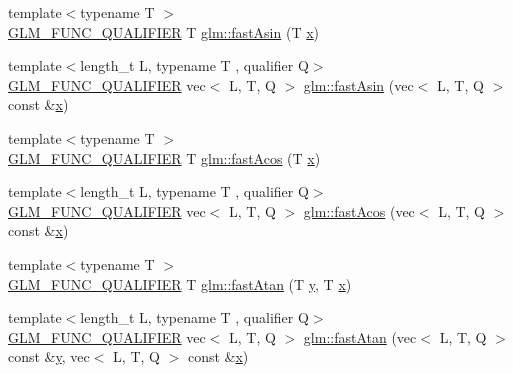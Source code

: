 \begin{DoxyCompactItemize}
\item 
{\footnotesize template$<$typename T $>$ }\\\mbox{\hyperlink{setup_8hpp_a33fdea6f91c5f834105f7415e2a64407}{G\+L\+M\+\_\+\+F\+U\+N\+C\+\_\+\+Q\+U\+A\+L\+I\+F\+I\+ER}} T \mbox{\hyperlink{group__gtx__fast__trigonometry_ga562cb62c51fbfe7fac7db0bce706b81f}{glm\+::fast\+Asin}} (T \mbox{\hyperlink{_s_d_l__opengl_8h_ad0e63d0edcdbd3d79554076bf309fd47}{x}})
\item 
{\footnotesize template$<$length\+\_\+t L, typename T , qualifier Q$>$ }\\\mbox{\hyperlink{setup_8hpp_a33fdea6f91c5f834105f7415e2a64407}{G\+L\+M\+\_\+\+F\+U\+N\+C\+\_\+\+Q\+U\+A\+L\+I\+F\+I\+ER}} vec$<$ L, T, Q $>$ \mbox{\hyperlink{namespaceglm_ab68197620bdf27dda884e87d5bc588f0}{glm\+::fast\+Asin}} (vec$<$ L, T, Q $>$ const \&\mbox{\hyperlink{_s_d_l__opengl_8h_ad0e63d0edcdbd3d79554076bf309fd47}{x}})
\item 
{\footnotesize template$<$typename T $>$ }\\\mbox{\hyperlink{setup_8hpp_a33fdea6f91c5f834105f7415e2a64407}{G\+L\+M\+\_\+\+F\+U\+N\+C\+\_\+\+Q\+U\+A\+L\+I\+F\+I\+ER}} T \mbox{\hyperlink{group__gtx__fast__trigonometry_ga9721d63356e5d94fdc4b393a426ab26b}{glm\+::fast\+Acos}} (T \mbox{\hyperlink{_s_d_l__opengl_8h_ad0e63d0edcdbd3d79554076bf309fd47}{x}})
\item 
{\footnotesize template$<$length\+\_\+t L, typename T , qualifier Q$>$ }\\\mbox{\hyperlink{setup_8hpp_a33fdea6f91c5f834105f7415e2a64407}{G\+L\+M\+\_\+\+F\+U\+N\+C\+\_\+\+Q\+U\+A\+L\+I\+F\+I\+ER}} vec$<$ L, T, Q $>$ \mbox{\hyperlink{namespaceglm_ae3688eb19af1c7efa981e983fee56340}{glm\+::fast\+Acos}} (vec$<$ L, T, Q $>$ const \&\mbox{\hyperlink{_s_d_l__opengl_8h_ad0e63d0edcdbd3d79554076bf309fd47}{x}})
\item 
{\footnotesize template$<$typename T $>$ }\\\mbox{\hyperlink{setup_8hpp_a33fdea6f91c5f834105f7415e2a64407}{G\+L\+M\+\_\+\+F\+U\+N\+C\+\_\+\+Q\+U\+A\+L\+I\+F\+I\+ER}} T \mbox{\hyperlink{group__gtx__fast__trigonometry_ga8d197c6ef564f5e5d59af3b3f8adcc2c}{glm\+::fast\+Atan}} (T \mbox{\hyperlink{_s_d_l__opengl_8h_a1675d9d7bb68e1657ff028643b4037e3}{y}}, T \mbox{\hyperlink{_s_d_l__opengl_8h_ad0e63d0edcdbd3d79554076bf309fd47}{x}})
\item 
{\footnotesize template$<$length\+\_\+t L, typename T , qualifier Q$>$ }\\\mbox{\hyperlink{setup_8hpp_a33fdea6f91c5f834105f7415e2a64407}{G\+L\+M\+\_\+\+F\+U\+N\+C\+\_\+\+Q\+U\+A\+L\+I\+F\+I\+ER}} vec$<$ L, T, Q $>$ \mbox{\hyperlink{namespaceglm_ac18dd649f172f948924f711c796a4d3d}{glm\+::fast\+Atan}} (vec$<$ L, T, Q $>$ const \&\mbox{\hyperlink{_s_d_l__opengl_8h_a1675d9d7bb68e1657ff028643b4037e3}{y}}, vec$<$ L, T, Q $>$ const \&\mbox{\hyperlink{_s_d_l__opengl_8h_ad0e63d0edcdbd3d79554076bf309fd47}{x}})

\end{DoxyCompactItemize}
